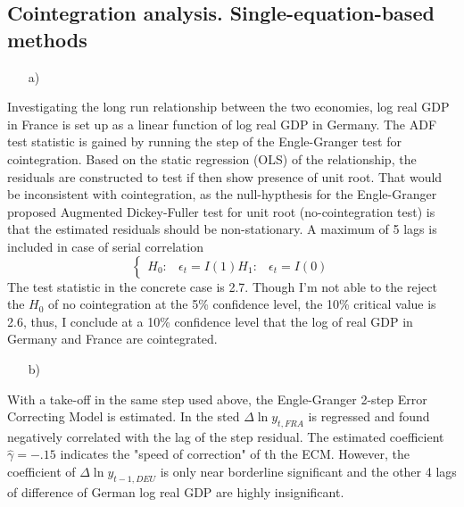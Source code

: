\subsection{Cointegration analysis. Single-equation-based methods}
\begin{itemize}
  \item[a)]
\end{itemize}
Investigating the long run relationship between the two economies, log real GDP in France is set up as a linear function of log real GDP in Germany.  The ADF test statistic is gained by running the  step of the Engle-Granger test for cointegration. Based on the static regression (OLS) of the relationship, the residuals are constructed to test if then show presence of unit root. That would be inconsistent with cointegration, as the null-hypthesis for the Engle-Granger proposed Augmented Dickey-Fuller test for unit root (no-cointegration test) is that the estimated residuals should be non-stationary. A maximum of 5 lags is included in case of serial correlation
\begin{equation}
  \left\{ \begin{array}{cccc}
   H_0: & \epsilon_t=I(1)
   H_1: & \epsilon_t=I(0)
  \end{array} \right.
  \label{eq:engle}
\end{equation}
The test statistic in the concrete case is 2.7. Though I'm not able to the reject the $H_0$ of no cointegration at the 5\% confidence level, the 10\% critical value is 2.6, thus, I conclude at a 10\% confidence level that the log of real GDP in Germany and France are cointegrated.
\begin{itemize}
  \item[b)]
\end{itemize}
With a take-off in the same  step used above, the Engle-Granger 2-step Error Correcting Model is estimated. In the  sted $\Delta \ln y_{t,FRA}$ is regressed and found negatively correlated with the lag of the  step residual. The estimated coefficient $\hat{\gamma}=-.15$ indicates the "speed of correction" of th the ECM. However, the coefficient of $\Delta \ln y_{t-1,DEU}$ is only near borderline significant and the other 4 lags of difference of German log real GDP are highly insignificant.
